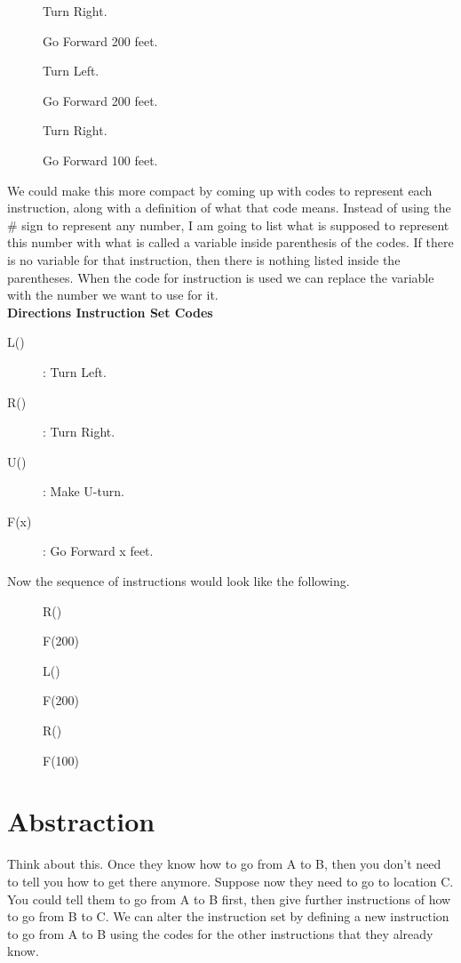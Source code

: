 \begin{description}
	\item[] Turn Right.
	\item[] Go Forward 200 feet.
	\item[] Turn Left.
	\item[] Go Forward 200 feet.
	\item[] Turn Right.
	\item[] Go Forward 100 feet.
\end{description}


We could make this more compact by coming up with codes to represent each instruction, along with a definition of what that code means. Instead of using the \# sign to represent any number, I am going to list what is supposed to represent this number with what is called a variable inside parenthesis of the codes. If there is no variable for that instruction, then there is nothing listed inside the parentheses. When the code for instruction is used we can replace the variable with the number we want to use for it.\\

\textbf{Directions Instruction Set Codes}
\begin{description}
	\item[L()] : Turn Left.
	\item[R()] : Turn Right.
	\item[U()] : Make U-turn.
	\item[F(x)] : Go Forward x feet.
\end{description}

Now the sequence of instructions would look like the following.

\begin{description}
	\item[] R()
	\item[] F(200)
	\item[] L()
	\item[] F(200)
	\item[] R()
	\item[] F(100)
\end{description}

\section{Abstraction}


Think about this. Once they know how to go from A to B, then you don't need to tell you how to get there anymore. Suppose now they need to go to location C. You could tell them to go from A to B first, then give further instructions of how to go from B to C. We can alter the instruction set by defining a new instruction to go from A to B using the codes for the other instructions that they already know.\\

